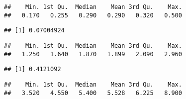 \documentclass[
]{article}
\newenvironment{Shaded}{\begin{snugshade}}{\end{snugshade}}
\newcommand{\DataTypeTok}[1]{\textcolor[rgb]{0.13,0.29,0.53}{#1}}
\newcommand{\KeywordTok}[1]{\textcolor[rgb]{0.13,0.29,0.53}{\textbf{#1}}}
\newcommand{\NormalTok}[1]{#1}
\newcommand{\OperatorTok}[1]{\textcolor[rgb]{0.81,0.36,0.00}{\textbf{#1}}}
\newcommand{\StringTok}[1]{\textcolor[rgb]{0.31,0.60,0.02}{#1}}
\begin{document}
\begin{verbatim}
##    Min. 1st Qu.  Median    Mean 3rd Qu.    Max. 
##   0.170   0.255   0.290   0.290   0.320   0.500
\end{verbatim}

\begin{Shaded}
\end{Shaded}

\begin{verbatim}
## [1] 0.07004924
\end{verbatim}

\begin{Shaded}
\end{Shaded}

\begin{verbatim}
##    Min. 1st Qu.  Median    Mean 3rd Qu.    Max. 
##   1.250   1.640   1.870   1.899   2.090   2.960
\end{verbatim}

\begin{Shaded}
\end{Shaded}

\begin{verbatim}
## [1] 0.4121092
\end{verbatim}

\begin{Shaded}
\end{Shaded}

\begin{verbatim}
##    Min. 1st Qu.  Median    Mean 3rd Qu.    Max. 
##   3.520   4.550   5.400   5.528   6.225   8.900
\end{verbatim}

\begin{Shaded}
\end{Shaded}
\end{document}
